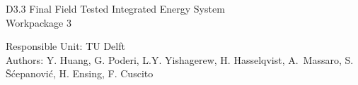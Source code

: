 
\begin{titlepage}

  \begin{center}
	
	\vspace*{-1.5cm}
    {\fontsize{36}{32}\selectfont\color{RedOrange}
        D3.3 Final Field Tested Integrated Energy System 
        \\ \vspace{.5cm}
		Workpackage 3
    }
	
	 \vfill
	 
    {\fontsize{18}{22}\color{RedOrange}
      Responsible Unit:  TU Delft
      \\ \vspace{.3cm}
      Authors: Y. Huang, G. Poderi, L.Y. Yishagerew, H. Hasselqvist, A.~Massaro, S. \v{S}\'{c}epanovi\'{c}, H. Ensing, F. Cuscito
    }

  \end{center}

\end{titlepage}
